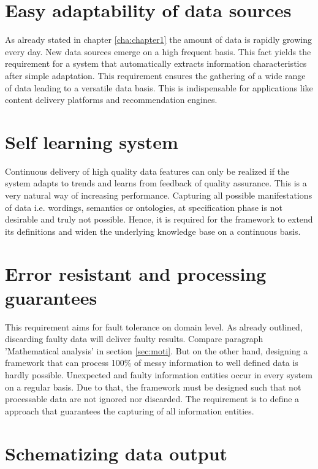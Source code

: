 \section{Easy adaptability of data sources}

As already stated in chapter \ref{cha:chapter1} the amount of data is rapidly growing every day. New data sources emerge on a high frequent basis. This fact yields the requirement for a system that automatically extracts information characteristics after simple adaptation. This requirement ensures the gathering of a wide range of data leading to a versatile data basis. This is indispensable for applications like content delivery platforms and recommendation engines.

\section{Self learning system}

Continuous delivery of high quality data features can only be realized if the system adapts to trends and learns from feedback of quality assurance. This is a very natural way of increasing performance. Capturing all possible manifestations of data i.e. wordings, semantics or ontologies, at specification phase is not desirable and truly not possible. Hence, it is required for the framework to extend its definitions and widen the underlying knowledge base on a continuous basis. 

\section{Error resistant and processing guarantees \label{sec:error}}

This requirement aims for fault tolerance on domain level. As already outlined, discarding faulty data will deliver faulty results. Compare paragraph 'Mathematical analysis' in section \ref{sec:moti}. But on the other hand, designing a framework that can process 100\% of messy information to well defined data is hardly possible. Unexpected and faulty information entities occur in every system on a regular basis. Due to that, the framework must be designed such that not processable data are not ignored nor discarded. The requirement is to define a approach that guarantees the capturing of all information entities.

\section{Schematizing data output}

